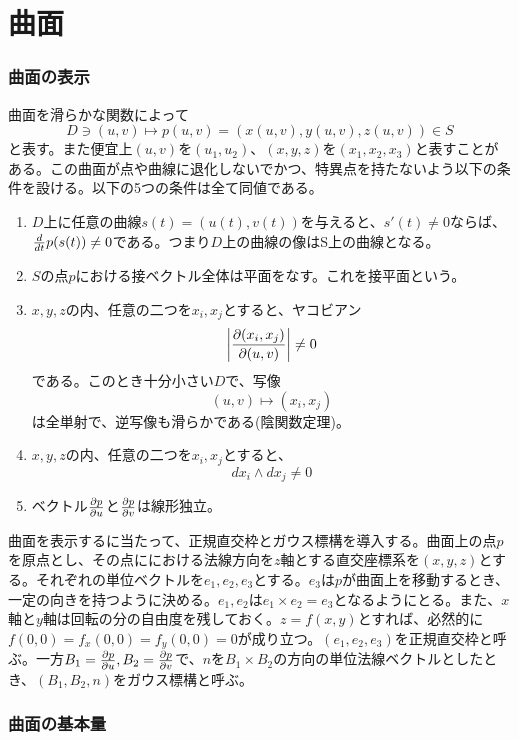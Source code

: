 \part{曲面}

\section{曲面の表示}
    曲面を滑らかな関数によって
        \[D \ni (u,v) \mapsto p(u,v) = (x(u,v), y(u,v), z(u,v)) \in S\]
    と表す。また便宜上$(u,v)$を$(u_1,u_2)$、$(x,y,z)$を$(x_1,x_2,x_3)$と表すことがある。この曲面が点や曲線に退化しないでかつ、特異点を持たないよう以下の条件を設ける。以下の5つの条件は全て同値である。
    \begin{enumerate}
        \item $D$上に任意の曲線$s(t) = (u(t),v(t))$を与えると、$s'(t) \neq 0$ならば、$\de{t}p(s(t)) \neq 0$である。つまり$D$上の曲線の像はS上の曲線となる。
        \item $S$の点$p$における接ベクトル全体は平面をなす。これを接平面という。
        \item $x,y,z$の内、任意の二つを$x_i,x_j$とすると、ヤコビアン
                  \[\left|\pd[(x_i,x_j)]{(u,v)}\right|\neq 0\]
              である。このとき十分小さい$D$で、写像
                  \[(u,v) \mapsto (x_i,x_j)\]
              は全単射で、逆写像も滑らかである(陰関数定理)。
        \item $x,y,z$の内、任意の二つを$x_i,x_j$とすると、
                  \[dx_i \wedge dx_j \neq 0\]
        \item ベクトル$\pd[p]{u}$と$\pd[p]{v}$は線形独立。
    \end{enumerate}
    曲面を表示するに当たって、正規直交枠とガウス標構を導入する。曲面上の点$p$を原点とし、その点ににおける法線方向を$z$軸とする直交座標系を$(x,y,z)$とする。それぞれの単位ベクトルを$e_1,e_2,e_3$とする。$e_3$は$p$が曲面上を移動するとき、一定の向きを持つように決める。$e_1,e_2$は$e_1 \times e_2 = e_3$となるようにとる。また、$x$軸と$y$軸は回転の分の自由度を残しておく。$z = f(x,y)$とすれば、必然的に$f(0,0) = f_x(0,0) = f_y(0,0) = 0$が成り立つ。$(e_1,e_2,e_3)$を正規直交枠と呼ぶ。一方$B_1 = \pd[p]{u}, B_2 = \pd[p]{v}$で、$n$を$B_1 \times B_2$の方向の単位法線ベクトルとしたとき、$(B_1,B_2,n)$をガウス標構と呼ぶ。

\section{曲面の基本量}
